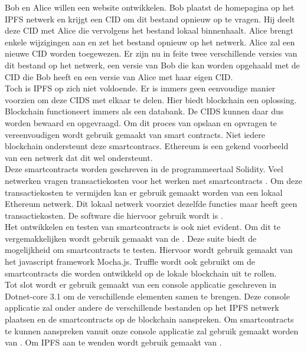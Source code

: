 Bob en Alice willen een website ontwikkelen. Bob plaatst de homepagina op het IPFS netwerk en krijgt een CID om dit bestand opnieuw op te vragen. Hij deelt deze CID met Alice die vervolgens het bestand lokaal binnenhaalt. Alice brengt enkele wijzigingen aan en zet het bestand opnieuw op het netwerk. Alice zal een nieuwe CID worden toegewezen. Er zijn nu in feite twee verschillende versies van dit bestand op het netwerk, een versie van Bob die kan worden opgehaald met de CID die Bob heeft en een versie van Alice met haar eigen CID.\\

Toch is IPFS op zich niet voldoende. Er is immers geen eenvoudige manier voorzien om deze CIDS met elkaar te delen. Hier biedt blockchain een oplossing. Blockchain functioneert immers als een databank. De CIDS kunnen daar dus worden bewaard en opgevraagd. Om dit proces van opslaan en opvragen te vereenvoudigen wordt gebruik gemaakt van smart contracts. Niet iedere blockchain ondersteunt deze smartcontracs. Ethereum is een gekend voorbeeld van een netwerk dat dit wel ondersteunt.\\

Deze smartcontracts worden geschreven in de programmeertaal Solidity. Veel netwerken vragen transactiekosten voor het werken met smartcontracts . Om deze transactiekosten te vermijden kan er gebruik gemaakt worden van een lokaal Ethereum netwerk. Dit lokaal netwerk voorziet dezelfde functies maar heeft geen transactiekosten. De software die hiervoor gebruik wordt is \textcite{Ganache}.\\

Het ontwikkelen en testen van smartcontracts is ook niet evident. Om dit te vergemakkelijken wordt gebruik gemaakt van de \textcite{Truffle}. Deze suite biedt de mogelijkheid om smartcontracts te testen. Hiervoor wordt gebruik gemaakt van het javascript framework Mocha.js. Truffle wordt ook gebruikt om de smartcontracts die worden ontwikkeld op de lokale blockchain uit te rollen.\\

Tot slot wordt er gebruik gemaakt van een console applicatie geschreven in Dotnet-core 3.1 om de verschillende elementen samen te brengen. Deze console applicatie zal onder andere de verschillende bestanden op het IPFS netwerk plaatsen en de smartcontracts op de blockchain aanspreken. Om smartcontracts te kunnen aanspreken vanuit onze console applicatie zal gebruik gemaakt worden van \textcite{Nethereum}. Om IPFS aan te wenden wordt gebruik gemaakt van \textcite{IPFSClient}.\\

